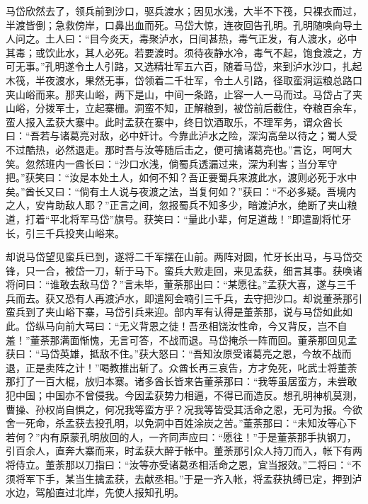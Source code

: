 马岱欣然去了，领兵前到沙口，驱兵渡水；因见水浅，大半不下筏，只裸衣而过，半渡皆倒；急救傍岸，口鼻出血而死。马岱大惊，连夜回告孔明。孔明随唤向导土人问之。土人曰：“目今炎天，毒聚泸水，日间甚热，毒气正发，有人渡水，必中其毒；或饮此水，其人必死。若要渡时。须待夜静水冷，毒气不起，饱食渡之，方可无事。”孔明遂令土人引路，又选精壮军五六百，随着马岱，来到泸水沙口，扎起木筏，半夜渡水，果然无事，岱领着二千壮军，令土人引路，径取蛮洞运粮总路口夹山峪而来。那夹山峪，两下是山，中间一条路，止容一人一马而过。马岱占了夹山峪，分拨军士，立起寨栅。洞蛮不知，正解粮到，被岱前后截住，夺粮百余车，蛮人报入孟获大寨中。此时孟获在寨中，终日饮酒取乐，不理军务，谓众酋长曰：“吾若与诸葛亮对敌，必中奸计。今靠此泸水之险，深沟高垒以待之；蜀人受不过酷热，必然退走。那时吾与汝等随后击之，便可擒诸葛亮也。”言讫，呵呵大笑。忽然班内一酋长曰：“沙口水浅，倘蜀兵透漏过来，深为利害；当分军守把。”获笑曰：“汝是本处土人，如何不知？吾正要蜀兵来渡此水，渡则必死于水中矣。”酋长又曰：“倘有土人说与夜渡之法，当复何如？”获曰：“不必多疑。吾境内之人，安肯助敌人耶？”正言之间，忽报蜀兵不知多少，暗渡泸水，绝断了夹山粮道，打着“平北将军马岱”旗号。获笑曰：“量此小辈，何足道哉！”即遣副将忙牙长，引三千兵投夹山峪来。

却说马岱望见蛮兵已到，遂将二千军摆在山前。两阵对圆，忙牙长出马，与马岱交锋，只一合，被岱一刀，斩于马下。蛮兵大败走回，来见孟获，细言其事。获唤诸将问曰：“谁敢去敌马岱？”言未毕，董荼那出曰：“某愿往。”孟获大喜，遂与三千兵而去。获又恐有人再渡泸水，即遣阿会喃引三千兵，去守把沙口。却说董荼那引蛮兵到了夹山峪下寨，马岱引兵来迎。部内军有认得是董荼那，说与马岱如此如此。岱纵马向前大骂曰：“无义背恩之徒！吾丞相饶汝性命，今又背反，岂不自羞！”董荼那满面惭愧，无言可答，不战而退。马岱掩杀一阵而回。董荼那回见孟获曰：“马岱英雄，抵敌不住。”获大怒曰：“吾知汝原受诸葛亮之恩，今故不战而退，正是卖阵之计！”喝教推出斩了。众酋长再三哀告，方才免死，叱武士将董荼那打了一百大棍，放归本寨。诸多酋长皆来告董荼那曰：“我等虽居蛮方，未尝敢犯中国；中国亦不曾侵我。今因孟获势力相逼，不得已而造反。想孔明神机莫测，曹操、孙权尚自惧之，何况我等蛮方乎？况我等皆受其活命之恩，无可为报。今欲舍一死命，杀孟获去投孔明，以免洞中百姓涂炭之苦。”董荼那曰：“未知汝等心下若何？”内有原蒙孔明放回的人，一齐同声应曰：“愿往！”于是董荼那手执钢刀，引百余人，直奔大寨而来，时孟获大醉于帐中。董荼那引众人持刀而入，帐下有两将侍立。董荼那以刀指曰：“汝等亦受诸葛丞相活命之恩，宜当报效。”二将曰：“不须将军下手，某当生擒孟获，去献丞相。”于是一齐入帐，将孟获执缚已定，押到泸水边，驾船直过北岸，先使人报知孔明。

